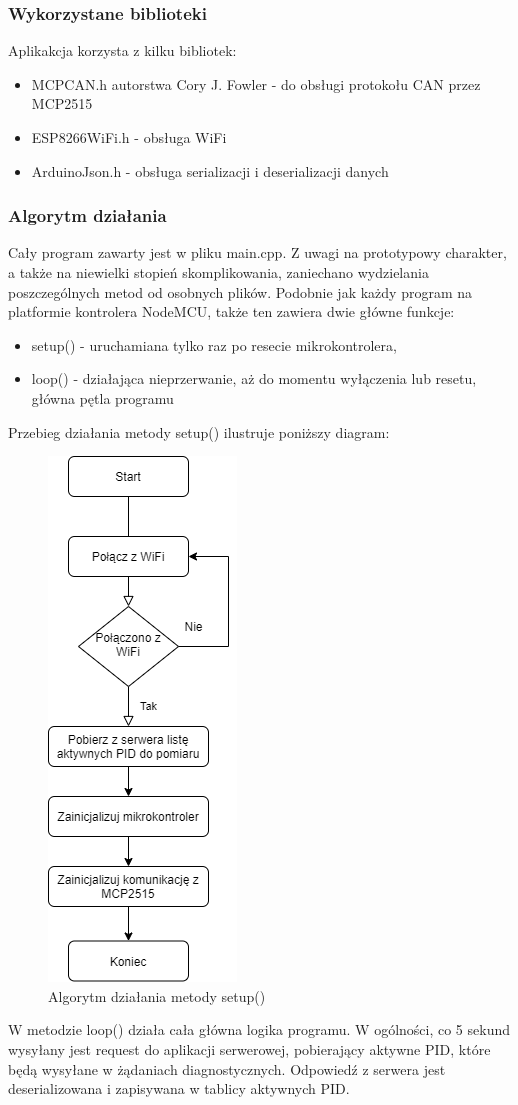 \documentclass[10pt,a4paper]{article}
\begin{document}
		\subsubsection {Wykorzystane biblioteki}
		Aplikakcja korzysta z kilku bibliotek:
		\begin{itemize}
			\item MCPCAN.h autorstwa Cory J. Fowler - do obsługi protokołu CAN przez MCP2515
			\item ESP8266WiFi.h - obsługa WiFi
			\item ArduinoJson.h - obsługa serializacji i deserializacji danych
		\end{itemize}
		\subsubsection{Algorytm działania}
		Cały program zawarty jest w pliku main.cpp. Z uwagi na prototypowy charakter, a także na niewielki stopień skomplikowania, zaniechano wydzielania poszczególnych metod od osobnych plików. Podobnie jak każdy program na platformie kontrolera NodeMCU, także ten zawiera dwie główne funkcje:
		\begin{itemize}
			\item setup() - uruchamiana tylko raz po resecie mikrokontrolera,
			\item loop() - działająca nieprzerwanie, aż do momentu wyłączenia lub resetu, główna pętla programu
		\end{itemize}
		Przebieg działania metody setup() ilustruje poniższy diagram:
		\begin{figure}[H]
			\centering
			\includegraphics[width=0.2\linewidth]{loop_algorymt}
			\caption[setup()- algorytm działania]{Algorytm działania metody setup()}
			\label{fig:loopalgorymt}
		\end{figure}
		W metodzie loop() działa cała główna logika programu. W ogólności, co 5 sekund wysyłany jest request do aplikacji serwerowej, pobierający aktywne PID, które będą wysyłane w żądaniach diagnostycznych. Odpowiedź z serwera jest deserializowana i zapisywana w tablicy aktywnych PID.
\end{document}
